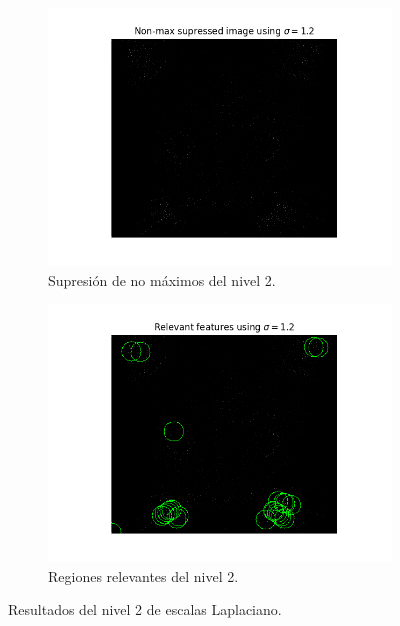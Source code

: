 \documentclass[11pt,a4paper]{article}
\begin{document}
\begin{figure}[H]
\begin{subfigure}{.5\linewidth}
	\centering
	\includegraphics[scale=0.5]{img/non-max2.png}
	\caption{Supresión de no máximos del nivel 2.}
	\label{fig:non-max2}
\end{subfigure}
\begin{subfigure}{.5\linewidth}
	\centering
	\includegraphics[scale=0.5]{img/features2.png}
	\caption{Regiones relevantes del nivel 2.}
	\label{fig:features2}
\end{subfigure}
\caption{Resultados del nivel 2 de escalas Laplaciano.}
\label{fig:lap-scale-space2}
\end{figure}
\end{document}
